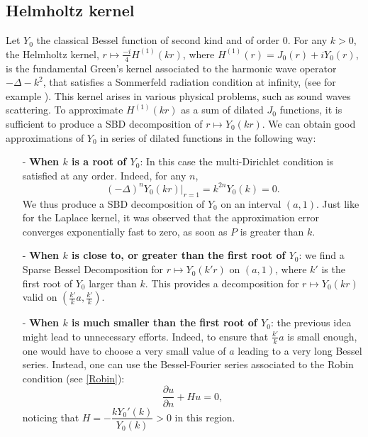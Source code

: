 \documentclass{article}
\begin{document}
																														
\subsection{Helmholtz kernel}
\label{HelmoholtzSubSection}
Let $Y_0$ the classical Bessel function of second kind and of order $0$. For any $k>0$, the Helmholtz kernel, $r \mapsto \frac{-i}{4}H^{(1)}(kr)$, where $H^{(1)}(r) = J_0(r) + i Y_0(r)$, is the fundamental Green's kernel associated to the harmonic wave operator $- \Delta - k^2$, that satisfies a Sommerfeld radiation condition at infinity, (see for example  \cite{wilcox1975scattering}). This kernel arises in various physical problems, such as sound waves scattering. To approximate $H^{(1)}(kr)$ as a sum of dilated $J_0$ functions, it is sufficient to produce a SBD decomposition of $r \mapsto Y_0(kr)$. We can obtain good approximations of $Y_0$ in series of dilated functions in the following way:
\begin{itemize}
	\item[-]\textbf{When $k$ is a root of $Y_0$}: In this case the multi-Dirichlet condition is satisfied at any order. Indeed, for any $n$, 
	\[(-\Delta)^n Y_0(kr)\big|_{r=1} = k^{2n} Y_0(k) = 0.\]
	We thus produce a SBD decomposition of $Y_0$ on an interval $(a,1)$. Just like for the Laplace kernel, it was observed that the approximation error converges exponentially fast to zero, as soon as $P$ is greater than $k$. 
	\item[-]\textbf{When $k$ is close to, or greater than the first root of $Y_0$}: we find a Sparse Bessel Decomposition for $r \mapsto Y_0(k'r)$ on $(a,1)$, where $k'$ is the first root of $Y_0$ larger than $k$. This provides a decomposition for $r \mapsto Y_0(kr)$ valid on $(\frac{k'}{k}a,\frac{k'}{k})$.
	\item[-]\textbf{When $k$ is much smaller than the first root of $Y_0$}: the previous idea might lead to unnecessary efforts. Indeed, to ensure that $\frac{k'}{k}a$ is small enough, one would have to choose a very small value of $a$ leading to a very long Bessel series. Instead, one can use the Bessel-Fourier series associated to the Robin condition (see \autoref{Robin}):
	\[\dfrac{\partial u}{\partial n} + H u = 0,\]
	noticing that $H = -\dfrac{k Y_0'(k)}{Y_0(k)} > 0$ in this region. 
\end{itemize}
\noindent
\end{document}
